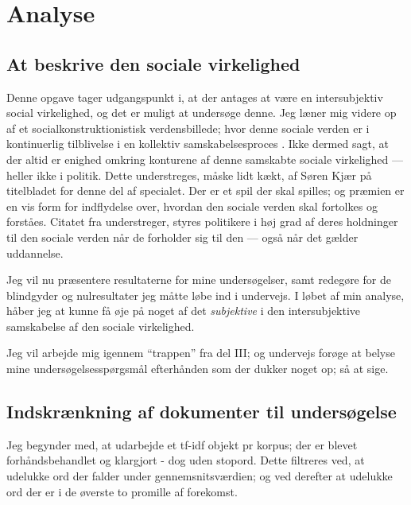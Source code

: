 \part{Analyse}\label{part:analysis}
\begin{epigraphs}
\end{epigraphs}
\chapter{At beskrive den sociale virkelighed}


Denne opgave tager udgangspunkt i, at der antages at være en intersubjektiv social virkelighed, og det er muligt at undersøge denne.
Jeg læner mig videre op af et socialkonstruktionistisk verdensbillede; hvor denne sociale verden er i kontinuerlig tilblivelse i en kollektiv samskabelsesproces .
Ikke dermed sagt, at der altid er enighed omkring konturene af denne samskabte sociale virkelighed — heller ikke i politik.
Dette understreges, måske lidt kækt, af Søren Kjær på titelbladet for denne del af specialet.
Der er et spil der skal spilles; og præmien er en vis form for indflydelse over, hvordan den sociale verden skal fortolkes og forståes.
Citatet fra  understreger, styres politikere i høj grad af deres holdninger til den sociale verden når de forholder sig til den — også når det gælder uddannelse.

Jeg vil nu præsentere resultaterne for mine undersøgelser, samt redegøre for de blindgyder og nulresultater jeg måtte løbe ind i undervejs.
I løbet af min analyse, håber jeg at kunne få øje på noget af det \textit{subjektive} i den intersubjektive samskabelse af den sociale virkelighed.

Jeg vil arbejde mig igennem “trappen” fra del III; og undervejs forøge at belyse mine undersøgelsesspørgsmål efterhånden som der dukker noget op; så at sige.

\chapter{Indskrænkning af dokumenter til undersøgelse}

Jeg begynder med, at udarbejde et tf-idf objekt pr korpus; der er blevet forhåndsbehandlet og klargjort - dog uden stopord.
Dette filtreres ved, at udelukke ord der falder under gennemsnitsværdien; og ved derefter at udelukke ord der er i de øverste to promille af forekomst.

